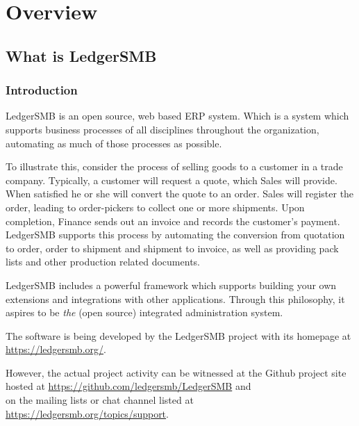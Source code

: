 
\part{Overview}
\label{part-overview}


\chapter{What is LedgerSMB}
\label{cha-what-is-ledgersmb}

\section{Introduction}
\label{sec-ledgersmb-introduction}
LedgerSMB is an open source, web based \gls{ERP} system. Which is a system
which supports business processes of all disciplines throughout the
organization, automating as much of those processes as possible. 

To
illustrate this, consider the process of selling goods to a customer
in a trade company. Typically, a customer will request a quote, which
Sales will provide. When satisfied he or she will convert the quote
to an order. Sales will register the order, leading to order-pickers
to collect one or more shipments. Upon completion, Finance sends
out an invoice and records the customer's payment. LedgerSMB supports
this process by automating the conversion from quotation to order,
order to shipment and shipment to invoice, as well as providing
pack lists and other production related documents.

LedgerSMB includes a
powerful framework which supports building your own extensions and
integrations with other applications. Through this philosophy, it
aspires to be \emph{the} (open source) integrated administration system.

The software is being developed by the LedgerSMB project with its
homepage at \url{https://ledgersmb.org/}.

However, the actual project activity can be witnessed at the Github
project site hosted at  \url{https://github.com/ledgersmb/LedgerSMB} and\\
on the mailing lists or chat channel 
listed at\\
\url{https://ledgersmb.org/topics/support}.

